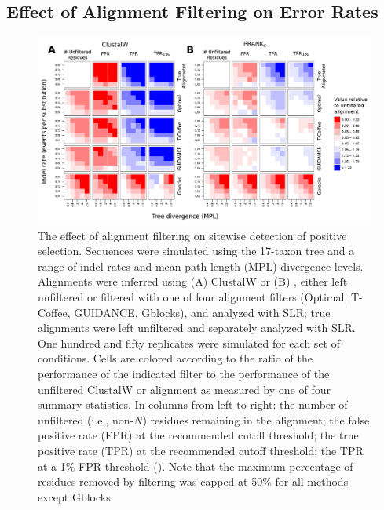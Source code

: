 \subsection{Effect of Alignment Filtering on \Sw Error Rates}

\begin{figure}[t!]
\centering
\includegraphics[scale=0.65]{Figs/fig5.pdf}
\caption{The effect of alignment filtering on sitewise detection of
  positive selection. Sequences were simulated using the 17-taxon tree
  and a range of indel rates and mean path length (MPL) divergence
  levels. Alignments were inferred using (A) ClustalW or (B) \prankc,
  either left unfiltered or filtered with one of four alignment
  filters (Optimal, T-Coffee, GUIDANCE, Gblocks), and analyzed with
  SLR; true alignments were left unfiltered and separately analyzed
  with SLR. One hundred and fifty replicates were simulated for each
  set of conditions. Cells are colored according to the ratio of the
  performance of the indicated filter to the performance of the
  unfiltered ClustalW or \prankc alignment as measured by one of four
  summary statistics. In columns from left to right: the number of
  unfiltered (i.e., non-$N$) residues remaining in the alignment; the
  false positive rate (FPR) at the recommended cutoff threshold; the
  true positive rate (TPR) at the recommended cutoff threshold; the
  TPR at a 1\% FPR threshold (\tpr). Note that the maximum percentage
  of residues removed by filtering was capped at 50\% for all methods
  except Gblocks.}
\label{fig_5}
\end{figure}

